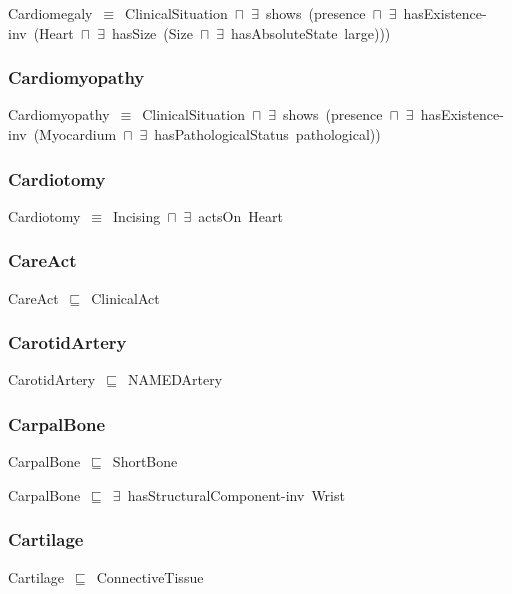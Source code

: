 \documentclass{article}
\begin{document}
Cardiomegaly~\ensuremath{\equiv}~ClinicalSituation~\ensuremath{\sqcap}~\ensuremath{\exists}~shows~(presence~\ensuremath{\sqcap}~\ensuremath{\exists}~hasExistence-inv~(Heart~\ensuremath{\sqcap}~\ensuremath{\exists}~hasSize~(Size~\ensuremath{\sqcap}~\ensuremath{\exists}~hasAbsoluteState~large)))

\subsubsection*{Cardiomyopathy}

Cardiomyopathy~\ensuremath{\equiv}~ClinicalSituation~\ensuremath{\sqcap}~\ensuremath{\exists}~shows~(presence~\ensuremath{\sqcap}~\ensuremath{\exists}~hasExistence-inv~(Myocardium~\ensuremath{\sqcap}~\ensuremath{\exists}~hasPathologicalStatus~pathological))

\subsubsection*{Cardiotomy}

Cardiotomy~\ensuremath{\equiv}~Incising~\ensuremath{\sqcap}~\ensuremath{\exists}~actsOn~Heart

\subsubsection*{CareAct}

CareAct~\ensuremath{\sqsubseteq}~ClinicalAct~

\subsubsection*{CarotidArtery}

CarotidArtery~\ensuremath{\sqsubseteq}~NAMEDArtery~

\subsubsection*{CarpalBone}

CarpalBone~\ensuremath{\sqsubseteq}~ShortBone~

CarpalBone~\ensuremath{\sqsubseteq}~\ensuremath{\exists}~hasStructuralComponent-inv~Wrist~

\subsubsection*{Cartilage}

Cartilage~\ensuremath{\sqsubseteq}~ConnectiveTissue~
\end{document}
